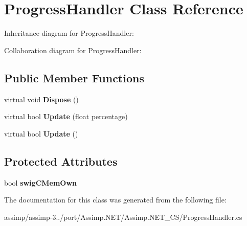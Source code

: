 \hypertarget{class_progress_handler}{\section{Progress\+Handler Class Reference}
\label{class_progress_handler}
}


Inheritance diagram for Progress\+Handler\+:


Collaboration diagram for Progress\+Handler\+:
\subsection*{Public Member Functions}
\begin{DoxyCompactItemize}
\item 
\hypertarget{class_progress_handler_a7e1cdab6d68735d383d3063375059af8}{virtual void {\bfseries Dispose} ()}\label{class_progress_handler_a7e1cdab6d68735d383d3063375059af8}

\item 
\hypertarget{class_progress_handler_a5887eeab3f592561ceb2b19e82757252}{virtual bool {\bfseries Update} (float percentage)}\label{class_progress_handler_a5887eeab3f592561ceb2b19e82757252}

\item 
\hypertarget{class_progress_handler_a3cd09caacc863dfd34a76cefb6c4f32e}{virtual bool {\bfseries Update} ()}\label{class_progress_handler_a3cd09caacc863dfd34a76cefb6c4f32e}

\end{DoxyCompactItemize}
\subsection*{Protected Attributes}
\begin{DoxyCompactItemize}
\item 
\hypertarget{class_progress_handler_a554baf9d6f0db7b05d1456ace02dc584}{bool {\bfseries swig\+C\+Mem\+Own}}\label{class_progress_handler_a554baf9d6f0db7b05d1456ace02dc584}

\end{DoxyCompactItemize}


The documentation for this class was generated from the following file\+:\begin{DoxyCompactItemize}
\item 
assimp/assimp-\/3../port/\+Assimp.\+N\+E\+T/\+Assimp.\+N\+E\+T\+\_\+\+C\+S/Progress\+Handler.\+cs\end{DoxyCompactItemize}
